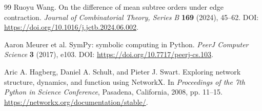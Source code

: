 \documentclass[11pt,reqno]{amsart}
\theoremstyle{plain}
\begin{document}
\begin{thebibliography}{99}
Ruoyu Wang. On the difference of mean subtree orders under edge contraction. \emph{Journal of Combinatorial Theory, Series B} \textbf{169} (2024), 45--62.
\newblock DOI: \url{https://doi.org/10.1016/j.jctb.2024.06.002}.

Aaron Meurer et al. SymPy: symbolic computing in Python. \emph{PeerJ Computer Science} \textbf{3} (2017), e103.
\newblock DOI: \url{https://doi.org/10.7717/peerj-cs.103}.

Aric A. Hagberg, Daniel A. Schult, and Pieter J. Swart. Exploring network structure, dynamics, and function using NetworkX. In \emph{Proceedings of the 7th Python in Science Conference}, Pasadena, California, 2008, pp. 11--15.
\newblock \url{https://networkx.org/documentation/stable/}.

\end{thebibliography}
\end{document}
